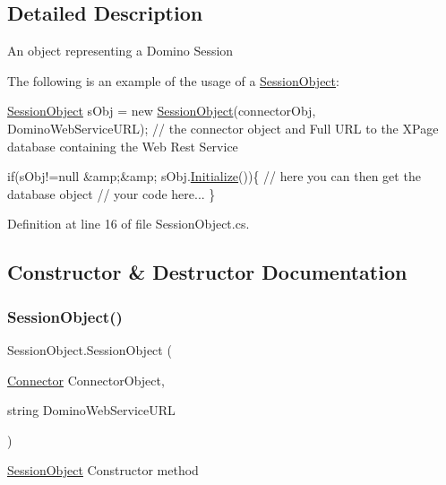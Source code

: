 \subsection{Detailed Description}
An object representing a Domino Session 

The following is an example of the usage of a {\ttfamily \mbox{\hyperlink{class_session_object}{Session\+Object}}}\+: 
\begin{DoxyCode}
\mbox{\hyperlink{class_session_object}{SessionObject}} sObj = \textcolor{keyword}{new} \mbox{\hyperlink{class_session_object_a173822a7aec467880195d79a1bc9f520}{SessionObject}}(connectorObj, DominoWebServiceURL); \textcolor{comment}{// the
       connector object and Full URL to the XPage database containing the Web Rest Service}

\textcolor{keywordflow}{if}(sObj!=null &amp;&amp; sObj.\mbox{\hyperlink{class_session_object_af3b9c9d56d98c848061952ed935f815b}{Initialize}}())\{
     \textcolor{comment}{// here you can then get the database object}
     \textcolor{comment}{// your code here... }
\}
\end{DoxyCode}
 

Definition at line 16 of file Session\+Object.\+cs.



\subsection{Constructor \& Destructor Documentation}
\mbox{\label{class_session_object_a173822a7aec467880195d79a1bc9f520}} 
\subsubsection{\texorpdfstring{Session\+Object()}{SessionObject()}}
{\footnotesize\ttfamily Session\+Object.\+Session\+Object (\begin{DoxyParamCaption}\item[{\mbox{\hyperlink{class_connector}{Connector}}}]{Connector\+Object,  }\item[{string}]{Domino\+Web\+Service\+U\+RL }\end{DoxyParamCaption})}



\mbox{\hyperlink{class_session_object}{Session\+Object}} Constructor method 


